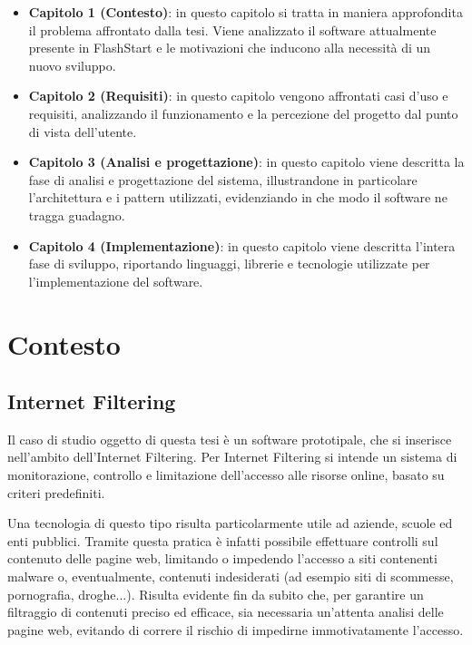 \documentclass[12pt,a4paper,openright,twoside]{book}
\newcommand{\itemdef}[1]{\item \textbf{#1}}
\begin{document}
\begin{itemize}

    \itemdef{Capitolo 1 (Contesto)}: in questo capitolo si tratta in maniera approfondita il problema affrontato dalla tesi.
    Viene analizzato il software attualmente presente in FlashStart e le motivazioni che inducono alla necessità di un nuovo sviluppo.
    
    \itemdef{Capitolo 2 (Requisiti)}: in questo capitolo vengono affrontati casi d'uso e requisiti, analizzando il funzionamento e la percezione del progetto dal punto di vista dell'utente.
    
    \itemdef{Capitolo 3 (Analisi e progettazione)}:
    in questo capitolo viene descritta la fase di analisi e progettazione del sistema,
    illustrandone in particolare l'architettura e i pattern utilizzati, evidenziando in che modo il software ne tragga guadagno.
    
    \itemdef{Capitolo 4 (Implementazione)}:
    in questo capitolo viene descritta l'intera fase di sviluppo, riportando linguaggi, librerie e tecnologie utilizzate per l'implementazione del software.

\end{itemize}

\mainmatter

\chapter{Contesto}
\label{chap:contesto}

\section{Internet Filtering}

Il caso di studio oggetto di questa tesi è un software prototipale, che si inserisce nell'ambito dell'Internet Filtering.
Per Internet Filtering si intende un sistema di monitorazione, controllo e limitazione dell'accesso alle risorse online, basato su criteri predefiniti.

Una tecnologia di questo tipo risulta particolarmente utile ad aziende, scuole ed enti pubblici.
Tramite questa pratica è infatti possibile effettuare controlli sul contenuto delle pagine web, limitando o impedendo l'accesso a siti contenenti malware o, eventualmente, contenuti indesiderati (ad esempio siti di scommesse, pornografia, droghe...).
Risulta evidente fin da subito che, per garantire un filtraggio di contenuti preciso ed efficace, sia necessaria un'attenta analisi delle pagine web, evitando di correre il rischio di impedirne immotivatamente l'accesso.
\end{document}
